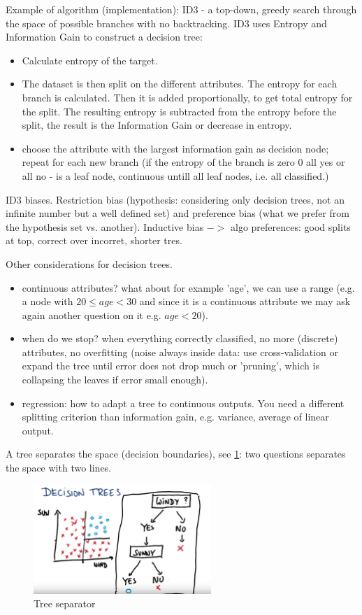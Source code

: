 \documentclass[11pt]{article}
\begin{document}
Example of algorithm (implementation): ID3 - a top-down, greedy search through the space of possible branches with no backtracking. ID3 uses Entropy and Information Gain to construct a decision tree:
\begin{itemize}
	\item Calculate entropy of the target.
	\item The dataset is then split on the different attributes. The entropy for each branch is calculated. Then it is added proportionally, to get total entropy for the split. The resulting entropy is subtracted from the entropy before the split, the result is the Information Gain or decrease in entropy. 
	\item choose the attribute with the largest information gain as decision node; repeat for each new branch (if the entropy of the branch is zero 0 all yes or all no -  is a leaf node, continuous untill all leaf nodes, i.e. all classified.)
\end{itemize}


ID3 biases. Restriction bias (hypothesis: considering only decision trees, not an infinite number but a well defined set) and preference bias (what we prefer from the hypothesis set vs. another). Inductive bias $->$ algo preferences: good splits at top, correct over incorret, shorter tres.

Other considerations for decision trees.
\begin{itemize}
	\item continuous attributes? what about for example 'age', we can use a range (e.g. a node with $20 \le age<30$ and since it is a continuous attribute we may ask again another question on it e.g. $age<20$).
	\item when do we stop? when everything correctly classified, no more (discrete) attributes, no overfitting (noise always inside data: use cross-validation or expand the tree until error does not drop much or 'pruning', which is collapsing the leaves if error small enough).
	\item regression: how to adapt a tree to continuous outputs. You need a different splitting criterion than information gain, e.g. variance, average of linear output.
\end{itemize}


A tree separates the space (decision boundaries), see \ref{tree_linear_separator}: two questions separates the space with two lines.
\begin{figure}[htbp] 
	\centering
	\includegraphics[width=0.6\textwidth]{pics/tree_linear_separator}
	\caption{Tree separator} 
	\label{tree_linear_separator}
\end{figure}
\end{document}

